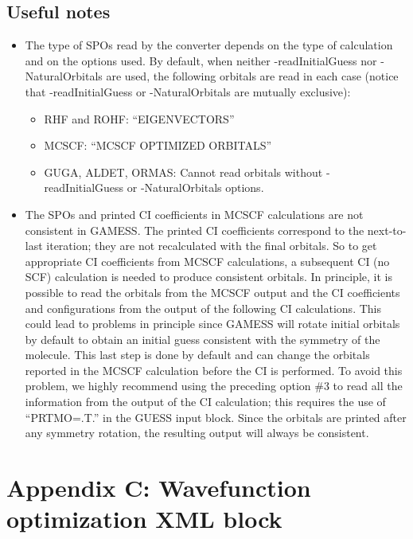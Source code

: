 \subsection{Useful notes}
\begin{itemize}
  \item{The type of SPOs read by the converter depends on the type of
calculation and on the options used. By default, when neither -readInitialGuess nor
-NaturalOrbitals are used, the following orbitals are read in each case (notice that
-readInitialGuess or -NaturalOrbitals are mutually exclusive):}
  \begin{itemize}
    \item{RHF and ROHF: “EIGENVECTORS”}
    \item{MCSCF: “MCSCF OPTIMIZED ORBITALS”}
    \item{GUGA, ALDET, ORMAS: Cannot read orbitals without -readInitialGuess or -NaturalOrbitals options.}
  \end{itemize}
  \item{The SPOs and printed CI coefficients in MCSCF calculations are
not consistent in GAMESS. The printed CI coefficients correspond to the next-to-last
iteration; they are not recalculated with the final orbitals. So to get appropriate 
CI coefficients from MCSCF calculations, a subsequent CI (no SCF) calculation
is needed to produce consistent orbitals. In principle, it is possible to read the orbitals 
from the MCSCF output and the CI coefficients and configurations from the
output of the following CI calculations. This could lead to problems in principle since
GAMESS will rotate initial orbitals by default to obtain an initial guess consistent 
with the symmetry of the molecule. This last step is done by default and can
change the orbitals reported in the MCSCF calculation before the CI is performed.
To avoid this problem, we highly recommend using the preceding option \#3 to
read all the information from the output of the CI calculation; this requires the use
of “PRTMO=.T.” in the GUESS input block. Since the orbitals are printed after any
symmetry rotation, the resulting output will always be consistent.}
\end{itemize}


\newpage
\section{Appendix C: Wavefunction optimization XML block}

